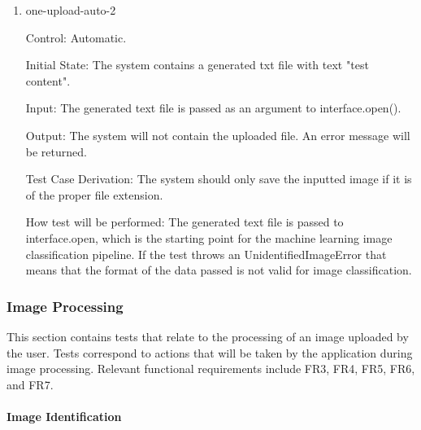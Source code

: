 \documentclass[12pt, titlepage]{article}
\begin{document}
\begin{enumerate}
		\item{one-upload-auto-2\\}
		
		Control: Automatic.
		
		Initial State: The system contains a generated txt file with text "test content".
		
		Input: The generated text file is passed as an argument to interface.open().
		
		Output: The system will not contain the uploaded file. An error message 
		will be returned.
		
		Test Case Derivation: The system should only save the inputted image if 
		it is of the proper file extension.
		
		How test will be performed: The generated text file is passed to interface.open, which is the starting point for the machine learning image classification pipeline. If the test throws an UnidentifiedImageError that means that the format of the data passed is not valid for image classification.

	\end{enumerate}
	
	\subsubsection{Image Processing}
	This section contains tests that relate to the processing of an image 
	uploaded by the user. Tests correspond to actions that will be taken by the 
	application during image processing. Relevant functional requirements 
	include FR3, FR4, FR5, FR6, and FR7.
	
	\paragraph{Image Identification}
	
\end{document}

